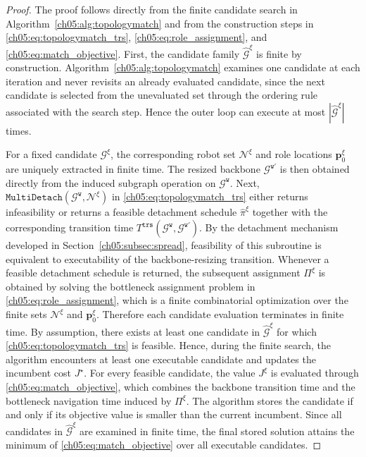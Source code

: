 \begin{proof}
The proof follows directly from the finite candidate search in
Algorithm~\ref{ch05:alg:topologymatch} and from the construction steps in
\eqref{ch05:eq:topologymatch_trs}, \eqref{ch05:eq:role_assignment},
and \eqref{ch05:eq:match_objective}.
First, the candidate family \(\widehat{\mathcal{G}}^{\xi}\) is finite
by construction. Algorithm~\ref{ch05:alg:topologymatch} examines one
candidate at each iteration and never revisits an already evaluated
candidate, since the next candidate is selected from the unevaluated
set through the ordering rule associated with the search step. Hence
the outer loop can execute at most
\(|\widehat{\mathcal{G}}^{\xi}|\) times.

For a fixed candidate \(\mathcal{G}^{\xi}\), the corresponding robot
set \(\mathcal{N}^{\xi}\) and role locations
\(\mathbf{p}_0^{\xi}\) are uniquely extracted in finite time. The
resized backbone \(\mathcal{G}^{\texttt{w}'}\) is then obtained
directly from the induced subgraph operation on
\(\mathcal{G}^{\texttt{w}}\). Next,
\(\texttt{MultiDetach}(\mathcal{G}^{\texttt{w}},\mathcal{N}^{\xi})\)
in \eqref{ch05:eq:topologymatch_trs} either returns infeasibility or
returns a feasible detachment schedule
\(\widehat{\pi}^{\xi}\) together with the corresponding transition
time \(T^{\texttt{trs}}(
\mathcal{G}^{\texttt{w}},\mathcal{G}^{\texttt{w}'})\). By the
detachment mechanism developed in
Section~\ref{ch05:subsec:spread}, feasibility of this subroutine is
equivalent to executability of the backbone-resizing transition.
Whenever a feasible detachment schedule is returned, the subsequent
assignment \(\Pi^{\xi}\) is obtained by solving the bottleneck
assignment problem in \eqref{ch05:eq:role_assignment}, which is a
finite combinatorial optimization over the finite sets
\(\mathcal{N}^{\xi}\) and \(\mathbf{p}_0^{\xi}\). Therefore each
candidate evaluation terminates in finite time.
By assumption, there exists at least one candidate in
\(\widehat{\mathcal{G}}^{\xi}\) for which
\eqref{ch05:eq:topologymatch_trs} is feasible. Hence, during the finite
search, the algorithm encounters at least one executable candidate and
updates the incumbent cost \(J^\star\). For every feasible candidate,
the value \(J^{\xi}\) is evaluated through
\eqref{ch05:eq:match_objective}, which combines the backbone
transition time and the bottleneck navigation time induced by
\(\Pi^{\xi}\). The algorithm stores the candidate if and only if its
objective value is smaller than the current incumbent. Since all
candidates in \(\widehat{\mathcal{G}}^{\xi}\) are examined in finite
time, the final stored solution attains the minimum of
\eqref{ch05:eq:match_objective} over all executable candidates.


\end{proof}

